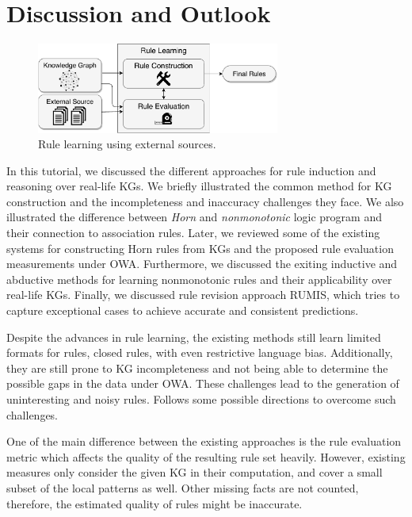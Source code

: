 \section{Discussion and Outlook}\label{sec:disc}

\begin{figure}[t]
\centering
\includegraphics[width=8cm]{figures/discussion_overview}
\caption{Rule learning using external sources.}
\label{fig:discussion_overview}
\end{figure}

In this tutorial, we discussed the different approaches for rule induction and reasoning over real-life KGs. We briefly illustrated the common method for KG construction and the incompleteness and inaccuracy challenges they face. We also illustrated the difference between \textit{Horn} and  \textit{nonmonotonic} logic program and their connection to association rules. Later, we reviewed some of the existing systems for constructing Horn rules from KGs and the proposed rule evaluation measurements under OWA. Furthermore, we discussed the exiting inductive and abductive methods for learning nonmonotonic rules and their applicability over real-life KGs. Finally, we discussed rule revision approach RUMIS, which tries to capture exceptional cases to achieve accurate and consistent predictions. 

Despite the advances in rule learning, the existing methods still learn limited formats for rules, \eg closed rules, with even restrictive language bias. Additionally, they are still prone to KG incompleteness and not being able to determine the possible gaps in the data under OWA. These challenges lead to the generation of uninteresting and noisy rules. Follows some possible directions to overcome such challenges. 


  One of the main difference between the existing approaches is the rule evaluation metric which affects the quality of the resulting rule set heavily. However,  existing measures only consider the given KG in their computation, and cover a small subset of the local patterns as well. Other missing facts are not counted, therefore, the estimated quality of rules might be inaccurate.

